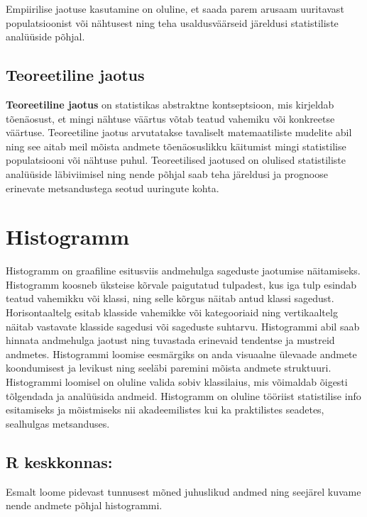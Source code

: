 \documentclass[
]{book}
\begin{document}
Empiirilise jaotuse kasutamine on oluline, et saada parem arusaam uuritavast populatsioonist või nähtusest ning teha usaldusväärseid järeldusi statistiliste analüüside põhjal.

\subsection{Teoreetiline jaotus}\label{teoreetiline-jaotus}

\textbf{Teoreetiline jaotus} on statistikas abstraktne kontseptsioon, mis kirjeldab tõenäosust, et mingi nähtuse väärtus võtab teatud vahemiku või konkreetse väärtuse. Teoreetiline jaotus arvutatakse tavaliselt matemaatiliste mudelite abil ning see aitab meil mõista andmete tõenäosuslikku käitumist mingi statistilise populatsiooni või nähtuse puhul. Teoreetilised jaotused on olulised statistiliste analüüside läbiviimisel ning nende põhjal saab teha järeldusi ja prognoose erinevate metsandustega seotud uuringute kohta.

\section{Histogramm}\label{histogramm}

Histogramm on graafiline esitusviis andmehulga sageduste jaotumise näitamiseks. Histogramm koosneb üksteise kõrvale paigutatud tulpadest, kus iga tulp esindab teatud vahemikku või klassi, ning selle kõrgus näitab antud klassi sagedust. Horisontaaltelg esitab klasside vahemikke või kategooriaid ning vertikaaltelg näitab vastavate klasside sagedusi või sageduste suhtarvu. Histogrammi abil saab hinnata andmehulga jaotust ning tuvastada erinevaid tendentse ja mustreid andmetes. Histogrammi loomise eesmärgiks on anda visuaalne ülevaade andmete koondumisest ja levikust ning seeläbi paremini mõista andmete struktuuri. Histogrammi loomisel on oluline valida sobiv klassilaius, mis võimaldab õigesti tõlgendada ja analüüsida andmeid. Histogramm on oluline tööriist statistilise info esitamiseks ja mõistmiseks nii akadeemilistes kui ka praktilistes seadetes, sealhulgas metsanduses.

\subsection{R keskkonnas:}\label{r-keskkonnas}

Esmalt loome pidevast tunnusest mõned juhuslikud andmed ning seejärel kuvame nende andmete põhjal histogrammi.
\end{document}
